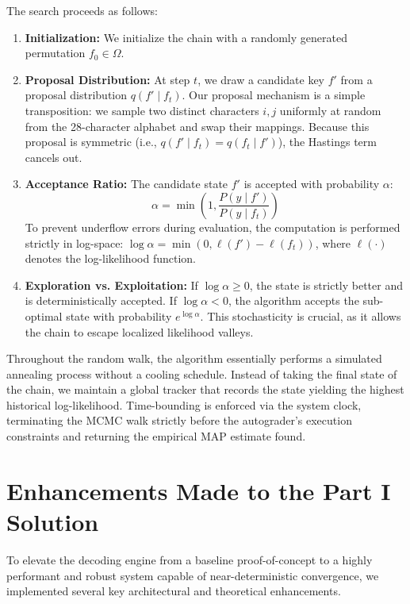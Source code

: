 \documentclass[11pt]{article}
\begin{document}
The search proceeds as follows:
\begin{enumerate}[leftmargin=*]
    \item \textbf{Initialization:} We initialize the chain with a randomly generated permutation $f_0 \in \Omega$.
    \item \textbf{Proposal Distribution:} At step $t$, we draw a candidate key $f'$ from a proposal distribution $q(f' \mid f_t)$. Our proposal mechanism is a simple transposition: we sample two distinct characters $i, j$ uniformly at random from the 28-character alphabet and swap their mappings. Because this proposal is symmetric (i.e., $q(f' \mid f_t) = q(f_t \mid f')$), the Hastings term cancels out.
    \item \textbf{Acceptance Ratio:} The candidate state $f'$ is accepted with probability $\alpha$:
    \begin{equation}
        \alpha = \min\left(1, \frac{P(y \mid f')}{P(y \mid f_t)}\right)
    \end{equation}
    To prevent underflow errors during evaluation, the computation is performed strictly in log-space: $\log \alpha = \min(0, \ell(f') - \ell(f_t))$, where $\ell(\cdot)$ denotes the log-likelihood function.
    \item \textbf{Exploration vs. Exploitation:} If $\log \alpha \geq 0$, the state is strictly better and is deterministically accepted. If $\log \alpha < 0$, the algorithm accepts the sub-optimal state with probability $e^{\log \alpha}$. This stochasticity is crucial, as it allows the chain to escape localized likelihood valleys.
\end{enumerate}

Throughout the random walk, the algorithm essentially performs a simulated annealing process without a cooling schedule. Instead of taking the final state of the chain, we maintain a global tracker that records the state yielding the highest historical log-likelihood. Time-bounding is enforced via the system clock, terminating the MCMC walk strictly before the autograder's execution constraints and returning the empirical MAP estimate found.

\section{Enhancements Made to the Part I Solution}

To elevate the decoding engine from a baseline proof-of-concept to a highly performant and robust system capable of near-deterministic convergence, we implemented several key architectural and theoretical enhancements.
\end{document}
